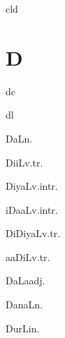 \begin{multicols*}{2}
\begin{dictroot}{cl}{d}
\end{dictroot}

\section*{D}

\begin{dictroot}{d}{c}
\end{dictroot}

\begin{dictroot}{d}{l}
    \begin{dictentry}{DaL}{n.}
    \end{dictentry}  
    \begin{dictentry}{DiiL}{v.tr.}
    \end{dictentry}  
    \begin{dictentry}{DiyaL}{v.intr.}
    \end{dictentry}
    \begin{dictentry}{iDaaL}{v.intr.}
    \end{dictentry}
    \begin{dictentry}{DiDiyaL}{v.tr.}
        \dictdef*{

        }
    \end{dictentry}
    \begin{dictentry}{aaDiL}{v.tr.}
        \dictdef*{

        }
    \end{dictentry}
    \begin{dictentry}{DaLa}{adj.}
    \end{dictentry}
    \begin{dictentry}{DanaL}{n.}
    \end{dictentry}
    \begin{dictentry}{DurLi}{n.}
        \dictdef*{

}
\end{dictentry}
\end{dictroot}
\end{multicols*}
